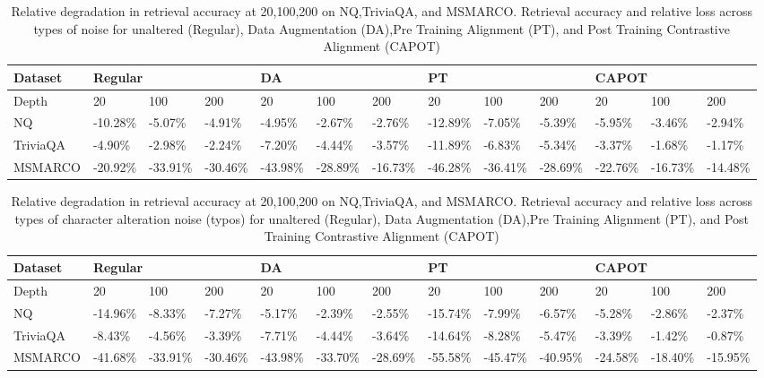 \begin{table*}[!ht]
    \centering
    \tiny
    \begin{tabular}{|l|l|l|l|l|l|l|l|l|l|l|l|l|}
    \hline
    Dataset & \multicolumn{3}{l}{Regular} &  \multicolumn{3}{l}{DA} & \multicolumn{3}{l}{PT} & \multicolumn{3}{l}{CAPOT}  \\ \hline 
        Depth & 20 & 100 & 200 & 20 & 100 & 200 & 20 & 100 & 200 & 20 & 100 & 200 \\ \hline
        NQ & -10.28\% & -5.07\% & -4.91\% & -4.95\% & -2.67\% & -2.76\% & -12.89\% & -7.05\% & -5.39\% & -5.95\% & -3.46\% & -2.94\% \\ \hline
        TriviaQA & -4.90\% & -2.98\% & -2.24\% & -7.20\% & -4.44\% & -3.57\% & -11.89\% & -6.83\% & -5.34\% & -3.37\% & -1.68\% & -1.17\% \\ \hline
        MSMARCO  & -20.92\% & -33.91\% & -30.46\% & -43.98\% & -28.89\% & -16.73\% & -46.28\% & -36.41\% & -28.69\% & -22.76\% &	-16.73\% & -14.48\% \\ \hline
    \end{tabular}
    \caption{Relative degradation in retrieval accuracy at 20,100,200 on NQ,TriviaQA, and MSMARCO. Retrieval accuracy and relative loss across types of noise for unaltered (Regular),  Data Augmentation (DA),Pre Training Alignment (PT), and Post Training Contrastive Alignment (CAPOT)}
    \label{tab:capot-vs-other-aggregate}
\end{table*}
\begin{table*}[!ht]
    \centering
    \tiny
    \begin{tabular}{|l|l|l|l|l|l|l|l|l|l|l|l|l|}
    \hline
    Dataset & \multicolumn{3}{l}{Regular} &  \multicolumn{3}{l}{DA} & \multicolumn{3}{l}{PT} & \multicolumn{3}{l}{CAPOT}  \\ \hline 
        Depth & 20 & 100 & 200 & 20 & 100 & 200 & 20 & 100 & 200 & 20 & 100 & 200 \\ \hline
        NQ & -14.96\% & -8.33\% & -7.27\% & -5.17\% & -2.39\% & -2.55\% & -15.74\% & -7.99\% & -6.57\% & -5.28\% & -2.86\% & -2.37\% \\ \hline
        TriviaQA & -8.43\% & -4.56\% & -3.39\% & -7.71\% & -4.44\% & -3.64\% & -14.64\% & -8.28\% & -5.47\% & -3.39\% & -1.42\% & -0.87\% \\ \hline
        MSMARCO  & -41.68\% & -33.91\% & -30.46\% & -43.98\% & -33.70\% & -28.69\% & -55.58\% & -45.47\% & -40.95\% & -24.58\% & -18.40\% & -15.95\% \\ \hline
    \end{tabular}
    \caption{Relative degradation in retrieval accuracy at 20,100,200 on NQ,TriviaQA, and MSMARCO. Retrieval accuracy and relative loss across types of character alteration noise (typos) for unaltered (Regular),  Data Augmentation (DA),Pre Training Alignment (PT), and Post Training Contrastive Alignment (CAPOT)}
    \label{tab:capot-vs-other-aggregate-typo}
\end{table*}
